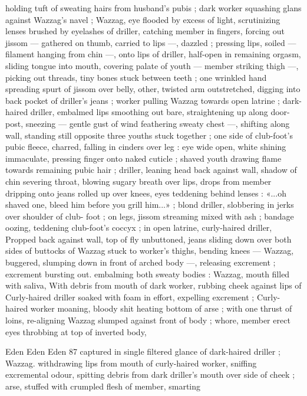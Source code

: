 holding tuft of sweating hairs from husband's pubis ; dark worker
squashing glans against Wazzag's navel ; Wazzag, eye flooded by
excess of light, scrutinizing lenses brushed by eyelashes of driller,
catching member in fingers, forcing out jissom — gathered on
thumb, carried to lips —, dazzled ; pressing lips, soiled — filament
hanging from chin —, onto lips of driller, half-open in remaining
orgasm, sliding tongue into mouth, covering palate of youth —
member striking thigh —, picking out threads, tiny bones stuck
between teeth ; one wrinkled hand spreading spurt of jissom over
belly, other, twisted arm outstretched, digging into back pocket of
driller's jeans ; worker pulling Wazzag towards open latrine ; dark-
haired driller, embalmed lips smoothing out bare, straightening up
along door-post, sneezing — gentle gust of wind feathering sweaty
chest —, shifting along wall, standing still opposite three youths
stuck together ; one side of club-foot's pubic fleece, charred, falling
in cinders over leg : eye wide open, white shining immaculate,
pressing finger onto naked cuticle ; shaved youth drawing flame
towards remaining pubic hair ; driller, leaning head back against wall,
shadow of chin severing throat, blowing sugary breath over lips,
drops from member dripping onto jeans rolled up over knees, eyes
teddening behind lenses : «...oh shaved one, bleed him before you
grill him...» ; blond driller, slobbering in jerks over shoulder of club-
foot ; on legs, jissom streaming mixed with ash ; bandage oozing,
teddening club-foot's coccyx ; in open latrine, curly-haired driller,
Propped back against wall, top of fly unbuttoned, jeans sliding down
over both sides of buttocks of Wazzag stuck to worker's thighs,
bending knees — Wazzag, buggered, slumping down in front of
arched body —, releasing excrement ; excrement bursting out.
embalming both sweaty bodies : Wazzag, mouth filled with saliva,
With debris from mouth of dark worker, rubbing cheek against lips of
Curly-haired driller soaked with foam in effort, expelling excrement ;
Curly-haired worker moaning, bloody shit heating bottom of arse ;
with one thrust of loins, re-aligning Wazzag slumped against front of
body ; whore, member erect eyes throbbing at top of inverted body,

Eden Eden Eden 87
captured in single filtered glance of dark-haired driller ; Wazzag.
withdrawing lips from mouth of curly-haired worker, sniffing
excremental odour, spitting debris from dark driller's mouth over side
of cheek ; arse, stuffed with crumpled flesh of member, smarting

